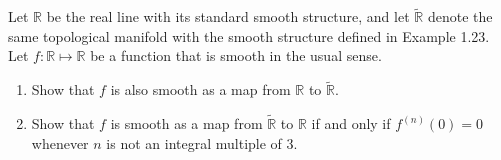 Let $\mathbb{R}$ be the real line with its standard smooth structure, and let $\tilde{\mathbb{R}}$ denote the same topological manifold with the smooth structure defined in Example 1.23.  Let $f:\mathbb{R} \mapsto \mathbb{R}$ be a function that is smooth in the usual sense.

\begin{enumerate}
\item Show that $f$ is also smooth as a map from $\mathbb{R}$ to $\tilde{\mathbb{R}}$.
\item Show that $f$ is smooth as a map from $\tilde{\mathbb{R}}$ to $\mathbb{R}$ if and only if $f^(n)(0) = 0$ whenever $n$ is not an integral multiple of 3.
\end{enumerate}